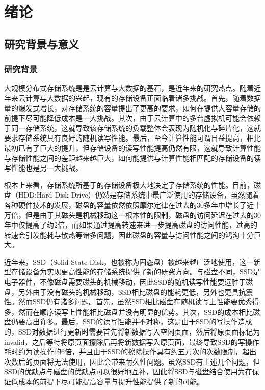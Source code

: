 
\chapter{绪论}
\label{chap:intro}

\section{研究背景与意义}

\subsection{研究背景}
\label{sec:backgrounds}

大规模分布式存储系统是是云计算与大数据的基石，是近年来的研究热点。随着近年来云计算与大数据的兴起，现有的存储设备正面临着诸多挑战。首先，随着数据量的爆发式增长，对存储系统的容量提出了更高的要求，如何在提供大容量存储的前提下尽可能降低成本是一大挑战\cite{gray2003next}。其次，由于云计算中的多台虚拟机可能会依赖于同一存储系统，这就导致该存储系统的负载整体会表现为随机化与碎片化，这就要求存储系统具有良好的随机读写性能。最后，至今计算性能可谓日益提高，相比最初已有了巨大的提升，但存储设备的读写性能提高仍然有限，这就导致计算性能与存储性能之间的差距越来越巨大\cite{morris2003evolution}，如何能提供与计算性能相匹配的存储设备的读写性能也是另一大挑战。

根本上来看，存储系统所基于的存储设备极大地决定了存储系统的性能。目前，磁盘（HDD:Hard Disk Drive）仍然是存储系统中最广泛使用的存储设备，虽然随着各种硬件技术的发展，磁盘的容量依然依照摩尔定律\cite{schirle1996history}在过去的30多年中增长了近十万倍，但是由于其磁头是机械移动这一根本性的限制，磁盘的访问延迟在过去的30年中仅提高了约2倍，而如果通过提高转速来进一步提高磁盘的访问性能，过高的转速会引发能耗与散热等诸多问题，因此磁盘的容量与访问性能之间的鸿沟十分巨大。

近年来，SSD（Solid State Disk，也被称为固态盘）被越来越广泛地使用，这一新型存储设备为实现更高性能的存储系统提供了新的研究方向。与磁盘不同，SSD是电子器件，不像磁盘需要磁头的机械移动，因此SSD的随机读写性能要远胜于磁盘，另外由于没有磁头的机械移动，SSD相比磁盘的能耗更低，另外也更具抗震性。然而SSD仍有诸多问题。首先，虽然SSD相比磁盘在随机读写上性能要优秀得多，然而在顺序读写上性能相比磁盘并没有明显的优势。其次，SSD的成本相比磁盘仍要高出许多。最后，SSD的读写性能并不对称，这是由于SSD的写操作造成的，SSD对数据进行更新时需要首先将新数据写入空闲页面，然后将原页面标记为invalid，之后等待将原页面擦除后再将新数据写入原页面，最终导致SSD的写操作耗时约为读操作的6倍，并且由于SSD的擦除操作具有约五万次的次数限制，超出次数后的页面将无法使用，因此会带来耐久性问题。虽然SSD有上述几个问题，但SSD的优缺点与磁盘的优缺点可以很好地互补，因此将SSD与磁盘结合使用为在保证低成本的前提下尽可能提高容量与提升性能提供了新的可能。


